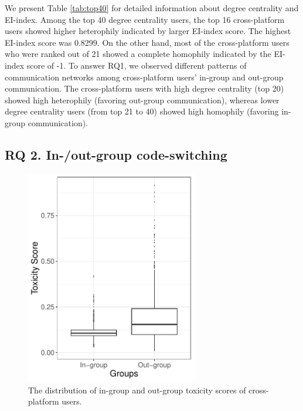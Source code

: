 \documentclass[Crown,sagev,times]{sagej}
\begin{document}
We present Table \ref{tab:top40} for detailed information about degree centrality and EI-index. Among the top 40 degree centrality users, the top 16 cross-platform users showed higher heterophily indicated by larger EI-index score. The highest EI-index score was 0.8299. On the other hand, most of the cross-platform users who were ranked out of 21 showed a complete homophily indicated by the EI-index score of -1. 
To answer RQ1, we observed different patterns of communication networks among cross-platform users' in-group and out-group communication. The cross-platform users with high degree centrality (top 20) showed high heterophily (favoring out-group communication), whereas lower degree centrality users (from top 21 to 40) showed high homophily (favoring in-group communication).

\subsection{RQ 2. In-/out-group code-switching} \label{sec:RQ2}

\begin{figure}[htp]
  \centering
  \includegraphics[width=7.5cm]{figure/toxicity_boxplot.pdf}
  \caption{The distribution of in-group and out-group toxicity scores of cross-platform users.} 
  \label{fig:RQ2_code-switching}
\end{figure}
\end{document}
